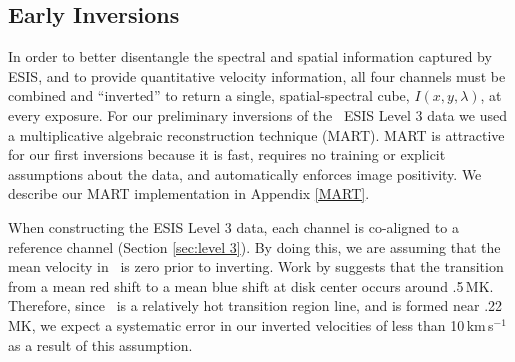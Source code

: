     
    
    \subsection{Early Inversions} \label{sec:inversions}
    	In order to better disentangle the spectral and spatial information captured by ESIS, and to provide quantitative velocity information, all four channels must be combined and ``inverted'' to return a single, spatial-spectral cube, $I(x,y,\lambda)$, at every exposure.
    	For our preliminary inversions of the \ov \  ESIS Level 3 data we used a multiplicative algebraic reconstruction technique (MART).
    	MART is attractive for our first inversions because it is fast, requires no training or explicit assumptions about the data, and automatically enforces image  positivity.
    	We describe our MART implementation in Appendix \ref{MART}.
    	
    	When constructing the ESIS Level 3 data, each channel is co-aligned to a reference channel (Section \ref{sec:level 3}).
    	By doing this, we are assuming that the mean velocity in \ov \ is zero prior to inverting.
    	Work by \citet{Peter1999} suggests that the transition from a mean red shift to a mean blue shift at disk center occurs around .5\,MK.
    	Therefore, since \ov \ is a relatively hot transition region line, and is formed near .22\,MK, we expect a systematic error in our inverted velocities of less than 10\,km\,s$^{-1}$ as a result of this assumption.
    	 
